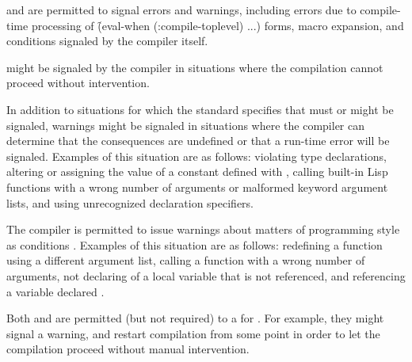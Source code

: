 

 and  are permitted to
signal errors and warnings, including errors due to compile-time
processing of \f{(eval-when (:compile-toplevel) ...)} forms,
macro expansion, and conditions signaled by the compiler itself.
                                                
  might be signaled by the compiler
in situations where the compilation cannot proceed without intervention.  
 
In addition to situations for which the standard specifies that
  must or might be signaled,
warnings might be signaled in situations where the compiler can
determine that the consequences are undefined or that a run-time
error will be signaled.  Examples of this situation are as follows: 
    violating type declarations,
    altering or assigning the value of a constant defined with ,
    calling built-in Lisp functions with a wrong number of arguments or malformed keyword
      argument lists, 
and using unrecognized declaration specifiers.
 
The compiler is permitted to issue warnings about matters of
programming style as conditions .
Examples of this situation are as follows:
      redefining a function using a different argument list,
      calling a function with a wrong number of arguments,
      not declaring  of a local variable that is not referenced,
  and referencing a variable declared .

Both  and  are permitted
(but not required) to  a 
for  .  For example, they
might signal a warning, and restart compilation from some
 point in order to let the 
compilation proceed without manual intervention.

